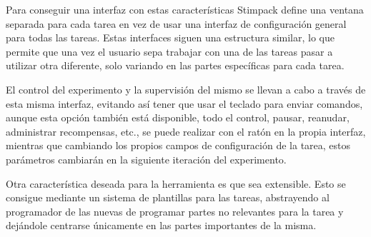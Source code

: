 \documentclass[conference]{IEEEtran}
\begin{document}
 Para conseguir una interfaz con estas características Stimpack define una ventana separada para cada tarea en vez de usar una interfaz de configuración general para todas las tareas. Estas interfaces siguen una estructura similar, lo que permite que una vez el usuario sepa trabajar con una de las tareas pasar a utilizar otra diferente, solo variando en las partes específicas para cada tarea.
 
 El control del experimento y la supervisión del mismo se llevan a cabo a través de esta misma interfaz, evitando así tener que usar el teclado para enviar comandos, aunque esta opción también está disponible, todo el control, pausar, reanudar, administrar recompensas, etc., se puede realizar con el ratón en la propia interfaz, mientras que cambiando los propios campos de configuración de la tarea, estos parámetros cambiarán en la siguiente iteración del experimento. 

Otra característica deseada para la herramienta es que  sea extensible. Esto se consigue mediante un sistema de plantillas para las tareas, abstrayendo al programador de las nuevas de programar partes no relevantes para la tarea y dejándole centrarse únicamente en las partes importantes de la misma.



\end{document}
